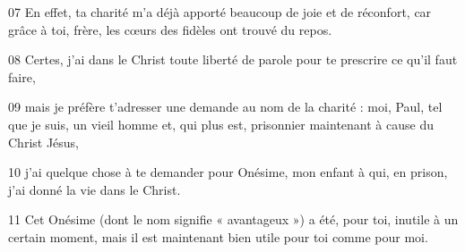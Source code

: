 
07 En effet, ta charité m’a déjà apporté beaucoup de joie et de réconfort, car grâce à toi, frère, les cœurs des fidèles ont trouvé du repos.

08 Certes, j’ai dans le Christ toute liberté de parole pour te prescrire ce qu’il faut faire,

09 mais je préfère t’adresser une demande au nom de la charité : moi, Paul, tel que je suis, un vieil homme et, qui plus est, prisonnier maintenant à cause du Christ Jésus,

10 j’ai quelque chose à te demander pour Onésime, mon enfant à qui, en prison, j’ai donné la vie dans le Christ.

11 Cet Onésime (dont le nom signifie « avantageux ») a été, pour toi, inutile à un certain moment, mais il est maintenant bien utile pour toi comme pour moi.
